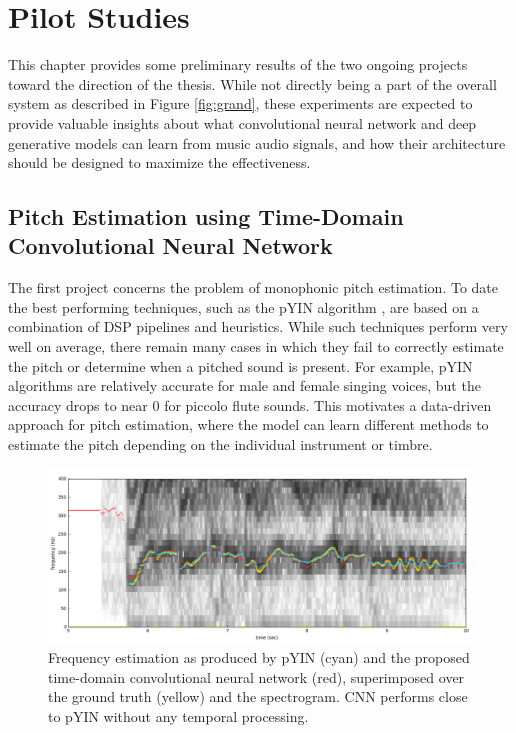 
\graphicspath{{5-pilot/figures/}}
\chapter{Pilot Studies}
\label{ch:pilot}


This chapter provides some preliminary results of the two ongoing projects toward the direction of the thesis. While not directly being a part of the overall system as described in Figure \ref{fig:grand}, these experiments are expected to provide valuable insights about what convolutional neural network and deep generative models can learn from music audio signals, and how their architecture should be designed to maximize the effectiveness.

\section{Pitch Estimation using Time-Domain Convolutional Neural Network}

The first project concerns the problem of monophonic pitch estimation.
To date the best performing techniques, such as the pYIN algorithm \cite{mauch2014pyin}, are based on a combination of DSP pipelines and heuristics.
While such techniques perform very well on average, there remain many cases in which they fail to correctly estimate the pitch or determine when a pitched sound is present.
For example, pYIN algorithms are relatively accurate for male and female singing voices, but the accuracy drops to near 0 for piccolo flute sounds.
This motivates a data-driven approach for pitch estimation, where the model can learn different methods to estimate the pitch depending on the individual instrument or timbre.

\begin{figure}
	\includegraphics[width=\textwidth]{crepe.png}
	\caption{Frequency estimation as produced by pYIN (cyan) and the proposed time-domain convolutional neural network (red), superimposed over the ground truth (yellow) and the spectrogram. CNN performs close to pYIN without any temporal processing.}\label{fig:crepe}
\end{figure}


